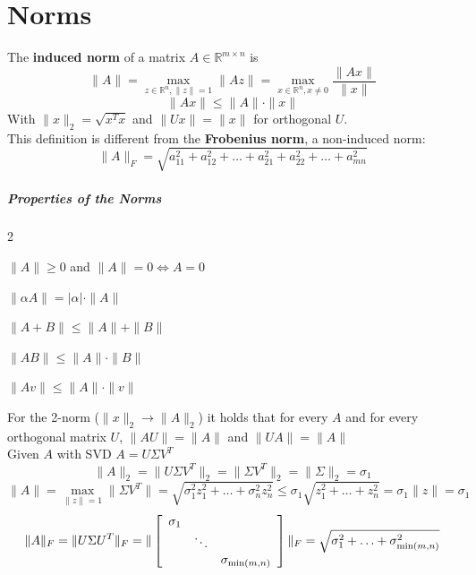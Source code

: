 \documentclass[10pt]{report}
\begin{document}
\section{Norms} The \textbf{induced norm} of a matrix $A\in \mathbb{R}^{m\times n}$ is 
$$\|A\|=\max_{z\in \mathbb{R}^n, \|z\|=1}\|Az\| = \max_{x\in\mathbb{R}^n,x\neq 0}\frac{\|Ax\|}{\|x\|}$$
$$\|Ax\|\leq \|A\|\cdot\|x\|$$
With $\|x\|_2 = \sqrt{x^Tx}$ and $\|Ux\|=\|x\|$ for orthogonal $U$.\\
This definition is different from the \textbf{Frobenius norm}, a non-induced norm:
$$\|A\|_F=\sqrt{a_{11}^2+a_{12}^2+\ldots+a_{21}^2+a_{22}^2+\ldots+a_{mn}^2}$$
\pagebreak
\subparagraph{Properties of the Norms}
\begin{multicols}{2}
\begin{list}{}{}
	\item $\|A\|\geq 0$ and $\|A\|=0\Leftrightarrow A=0$
	\item $\|\alpha A\|=|\alpha|\cdot\|A\|$
	\item $\|A+B\| \leq \|A\|+\|B\|$
	\item $\|AB\| \leq \|A\|\cdot\|B\|$
	\item $\|Av\| \leq \|A\|\cdot\|v\|$
\end{list}
\end{multicols}
For the 2-norm ($\|x\|_2\rightarrow \|A\|_2$) it holds that for every $A$ and for every orthogonal matrix $U$, $\|AU\| = \|A\|$ and $\|UA\|=\|A\|$\\
Given $A$ with SVD $A=U\Sigma V^T$
$$\|A\|_2 = \|U\Sigma V^T\|_2 = \|\Sigma V^T\|_2 = \|\Sigma\|_2 = \sigma_1$$
$$\|A\| = \max_{\|z\| = 1} \|\Sigma V^T\| = \sqrt{\sigma_1^2 z_1^2 + \ldots + \sigma_n^2 z_n^2} \leq \sigma_1 \sqrt{z_1^2 +\ldots + z_n^2} = \sigma_1\|z\| = \sigma_1$$
$$\|A\|_F = \|U\Sigma U^T\|_F = \|\left[\begin{array}{c c c}
\sigma_1\\
&\ddots\\
&& \sigma_{\min(m,n)}
\end{array}\right]\|_F = \sqrt{\sigma_1^2+\ldots+\sigma_{\min(m,n)}^2}$$
\end{document}
